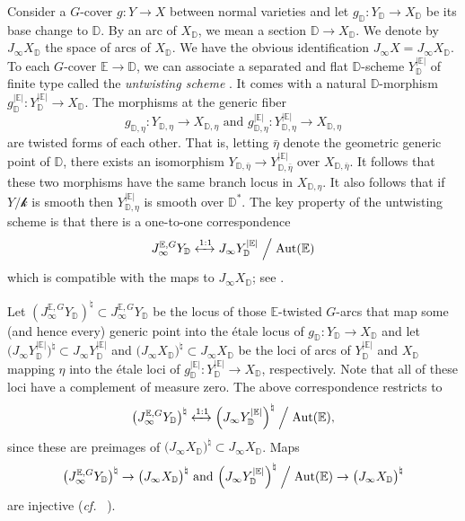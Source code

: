 \documentclass[12pt]{amsart}
\theoremstyle{plain}   %
\theoremstyle{definition}    %
\theoremstyle{remark}    %
\numberwithin{equation}{theorem}
\DeclareMathOperator{\Aut}{{Aut}}
\newcommand{\kay}{\mathcal{k}}
\newcommand{\bD}{\mathbb{D}}
\newcommand{\bE}{\mathbb{E}}
\newcommand{\cf}{{\itshape cf.} }
\begin{document}
Consider a $G$-cover $g\colon Y\to X$ between normal varieties and let $g_\bD \colon Y_\bD \to X_\bD$ be its base change to $\bD$. By an arc of $X_\bD$, we mean a section $\bD \to X_\bD$. We denote by $J_\infty X_\bD$ the space of arcs of $X_\bD$. We have the obvious identification $J_\infty X=J_\infty X_\bD$. To each $G$-cover $\bE\to \bD$, we can associate a separated and flat $\bD$-scheme $Y^{|\bE|}_\bD$ of finite type called the \emph{untwisting scheme} \cite[Definition 7.2]{YasudaWilderMcKayCorrespondence}. It comes with a natural $\bD$-morphism $g_\bD^{|\bE|}\colon Y^{|\bE|}_\bD \to X_\bD$. The morphisms at the generic fiber
\[
g_{\bD,\eta} \colon Y_{\bD,\eta} \to X_{\bD,\eta}   \text{   and   } 
g_{\bD,\eta}^{|\bE|} \colon Y_{\bD,\eta}^{|\bE|}\to X_{\bD,\eta}
\]
are twisted forms of each other. That is, letting $\bar{\eta}$ denote the geometric generic point of $\bD$, there exists an isomorphism $Y_{\bD,\bar{\eta}} \to Y_{\bD,\bar{\eta}}^{|\bE|}$ over $X_{\bD,\bar{\eta}}$. It follows that these two morphisms have the same branch locus in $X_{\bD,\eta}$. It also follows that if $Y/\kay$ is smooth then $Y_{\bD,\eta}^{|\bE|}$ is smooth over $\bD^*$. The key property of the untwisting scheme is that there is a one-to-one correspondence
\[
 J_\infty^{\bE,G}Y_\bD \xleftrightarrow{1:1} J_\infty Y_\bD ^{|\bE|}\Bigm/\Aut(\bE)
\]
which is compatible with the maps to $J_\infty X_\bD$; see \cite[the last display of p.~140]{YasudaWilderMcKayCorrespondence}. 

Let $(J_\infty^{\bE,G}Y_\bD)^\natural\subset J_\infty^{\bE,G}Y_\bD$ be the locus of those $\bE$-twisted $G$-arcs that map some (and hence every) generic point into the \'etale locus of $g_{\bD}\colon Y_\bD \to X_\bD$ and let $\big(J_\infty Y_\bD^{|\bE|}\big)^\natural\subset J_\infty Y_\bD^{|\bE|}$ and $\big(J_\infty X_\bD\big)^\natural\subset J_\infty X_\bD$ be the loci of arcs of $Y_\bD^{|\bE|}$ and $X_\bD$  mapping $\eta$ into the \'etale loci of $g_{\bD}^{|\bE|} \colon Y_\bD^{|\bE|}\to X_\bD$, respectively. Note that all of these loci have a complement of measure zero. The above correspondence restricts to
\[
\big(J_\infty^{\bE,G}Y_\bD \big)^\natural \xleftrightarrow{1:1} \Big(J_\infty Y_\bD^{|\bE|}\Big)^\natural\Bigm/\Aut(\bE),\] 
since these are preimages of $\big(J_\infty X_\bD\big)^\natural\subset J_\infty X_\bD$. 
Maps 
\[
\big(J_\infty^{\bE,G}Y_\bD \big)^\natural \to \big(J_\infty X_\bD\big)^\natural
\text{ and }
\Big(J_\infty Y_\bD^{|\bE|}\Big)^\natural\Bigm/\Aut(\bE) \to \big(J_\infty X_\bD\big)^\natural
\]
are injective (\cf\ \cite[Proposition 6.16]{YasudaPAdic}).
 
\end{document}

